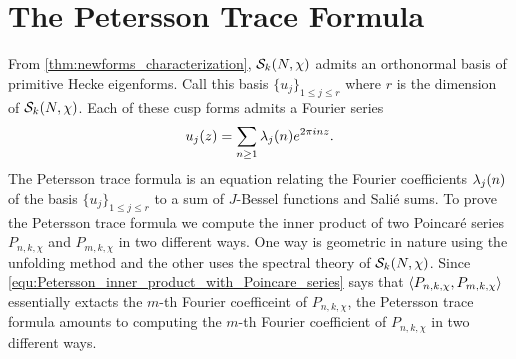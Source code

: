     \section{The Petersson Trace Formula}
      From \cref{thm:newforms_characterization}, $\mathcal{S}_{k}(N,\chi)$ admits an orthonormal basis of primitive Hecke eigenforms. Call this basis $\{u_{j}\}_{1 \le j \le r}$ where $r$ is the dimension of $\mathcal{S}_{k}(N,\chi)$. Each of these cusp forms admits a Fourier series
      \[
        u_{j}(z) = \sum_{n \ge 1}\lambda_{j}(n)e^{2\pi inz}.
      \]
      The Petersson trace formula is an equation relating the Fourier coefficients $\lambda_{j}(n)$ of the basis $\{u_{j}\}_{1 \le j \le r}$ to a sum of $J$-Bessel functions and Sali\'e sums. To prove the Petersson trace formula we compute the inner product of two Poincar\'e series $P_{n,k,\chi}$ and $P_{m,k,\chi}$ in two different ways. One way is geometric in nature using the unfolding method and the other uses the spectral theory of $\mathcal{S}_{k}(N,\chi)$. Since \cref{equ:Petersson_inner_product_with_Poincare_series} says that $\langle P_{n,k,\chi},P_{m,k,\chi}\rangle$ essentially extacts the $m$-th Fourier coefficeint of $P_{n,k,\chi}$, the Petersson trace formula amounts to computing the $m$-th Fourier coefficient of $P_{n,k,\chi}$ in two different ways.

